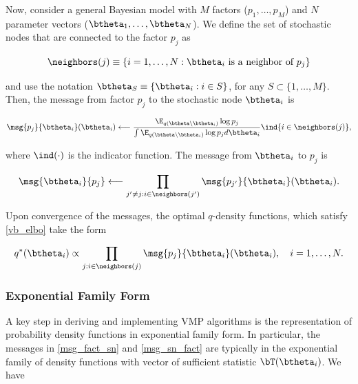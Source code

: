 \documentclass[12pt]{article}
\theoremstyle{plain}
\theoremstyle{definition}
\theoremstyle{remark}
\begin{document}
Now, consider a general Bayesian model with $M$ factors ($p_1, \dots, p_M$) and $N$ parameter vectors
($\btheta_1, \dots, \btheta_N$). We define the set of stochastic nodes that are connected to the factor
$p_j$ as

\[
	\neighbors (j) \equiv \{ i = 1, \dots, N: \text{$\btheta_i$ is a neighbor of $p_j$} \}
\]

\noindent and use the notation
$\btheta_S \equiv \{ \btheta_i : i \in S \}$, for any $S \subset \{ 1, \dots, M \}$. Then, the message from factor
$p_j$ to the stochastic node $\btheta_i$ is

\begin{equation}
	\msg{p_j}{\btheta_i} (\btheta_i)
		\longleftarrow
			\frac{
				\E_{q(\btheta \setminus \btheta_i)} \log p_j
			} {
				\int \E_{q(\btheta \setminus \btheta_i)} \log p_j d\btheta_i
			} \ind \{ i \in \neighbors(j) \},
\label{msg_fact_sn}
\end{equation}

\noindent where $\ind (\cdot)$ is the indicator function. The message from $\btheta_i$ to $p_j$ is

\begin{equation}
	\msg{\btheta_i}{p_j}
		\longleftarrow
			\prod_{j' \neq j : i \in \neighbors(j')} \msg{p_{j'}}{\btheta_i} (\btheta_i).
\label{msg_sn_fact}
\end{equation}

\noindent Upon convergence of the messages, the optimal $q$-density functions, which satisfy \eqref{vb_elbo}
take the form

\begin{equation}
	q^* (\btheta_i) \propto \prod_{j : i \in \neighbors(j)} \msg{p_j}{\btheta_i} (\btheta_i), \quad i = 1, \dots, N.
\label{opt_q_vmp}
\end{equation}


\subsubsection{Exponential Family Form}
\label{sec:exp_fam_form}

A key step in deriving and implementing VMP algorithms is the representation of probability density functions
in exponential family form. In particular, the messages in \eqref{msg_fact_sn} and \eqref{msg_sn_fact}
are typically in the exponential family of density functions with vector of sufficient statistic $\bT (\btheta_i)$. We have
\end{document}
